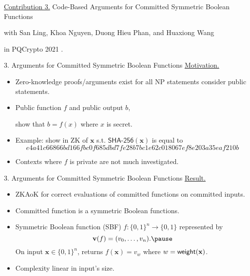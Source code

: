 \begin{frame}
	\underline{Contribution 3.} Code-Based Arguments for Committed Symmetric Boolean Functions
	
	{\small with San Ling, Khoa Nguyen, Duong Hieu Phan, and Huaxiong Wang}
	
	in PQCrypto 2021 \cite{LingNPTW21}.
\end{frame}

\begin{frame}{3. Arguments for Committed Symmetric Boolean Functions}
	\underline{Motivation.} \pause
	\begin{itemize}
		\item Zero-knowledge proofs/arguments exist for all NP statements consider public statements.\pause
		\item Public function $f$ and public output $b$, \pause
		
		show that $b = f(x)$ where $x$ is secret.\pause
		\item Example: show in ZK of $\mathbf{x}$ s.t. $\textsf{SHA-256}(\mathbf{x})$ is equal to\pause
		{\footnotesize \begin{equation*}
			e4a41c66866bd166fbc0f685dbd7fe28b7bc1e62c018067ef8e203a35eaf210b
		\end{equation*}}\pause
		\item Contexts where $f$ is private are not much investigated.
	\end{itemize}
\end{frame} 
\begin{frame}{3. Arguments for Committed Symmetric Boolean Functions}
	\underline{Result.}\pause
	\begin{itemize}
		\item ZKAoK for correct evaluations of committed functions on committed inputs.\pause
		\item Committed function is a symmetric Boolean functions.\pause
		\item Symmetric Boolean function (SBF) $f : \{0,1\}^n \to \{0,1\}$ represented by \pause
		\begin{equation*}
			\mathbf{v}(f) = (v_0, \dots, v_n).\pause
		\end{equation*}
		On input $\mathbf{x} \in \{0,1\}^n$, returns $f(\mathbf{x}) = v_w$ where $w = \mathsf{weight}(\mathbf{x})$.\pause
		\item Complexity linear in input's size.
	\end{itemize}
\end{frame}

